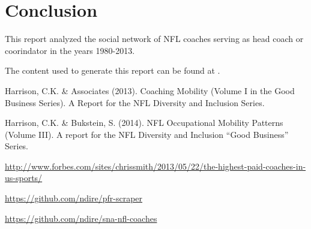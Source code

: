 \documentclass[11pt]{article}\usepackage[]{graphicx}\usepackage[]{color}
\begin{document}


\section{Conclusion}

This report analyzed the social network of NFL coaches serving as head coach or
coorindator in the years 1980-2013.

The content used to generate this report can be found at \cite{project}.

\begin{thebibliography}{99}

 Harrison, C.K. \& Associates (2013). Coaching Mobility (Volume I in the Good Business Series). A Report for the NFL Diversity and Inclusion Series.

 Harrison, C.K. \& Bukstein, S. (2014). NFL Occupational Mobility Patterns (Volume III). A report for the NFL Diversity and Inclusion “Good Business” Series.

  \url{http://www.forbes.com/sites/chrissmith/2013/05/22/the-highest-paid-coaches-in-us-sports/}

 \url{https://github.com/ndire/pfr-scraper}

 \url{https://github.com/ndire/sna-nfl-coaches}

\end{thebibliography}
\end{document}
